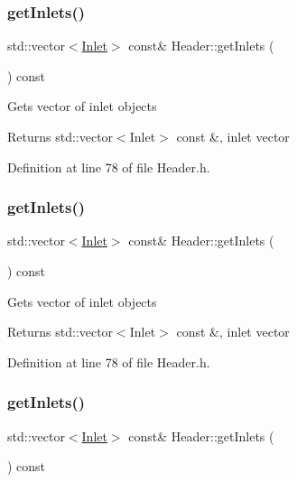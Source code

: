 \subsubsection{\texorpdfstring{get\+Inlets()}{getInlets()}\hspace{0.1cm}{\footnotesize\ttfamily [1/3]}}
{\footnotesize\ttfamily std\+::vector$<$\hyperlink{class_inlet}{Inlet}$>$ const\& Header\+::get\+Inlets (\begin{DoxyParamCaption}{ }\end{DoxyParamCaption}) const\hspace{0.3cm}{\ttfamily [inline]}}

Gets vector of inlet objects \begin{DoxyReturn}{Returns}
std\+::vector$<$\+Inlet$>$ const \&, inlet vector 
\end{DoxyReturn}


Definition at line 78 of file Header.\+h.

\mbox{\label{class_header_a625d7317488c88c949acd05c72a7c54a}} 
\subsubsection{\texorpdfstring{get\+Inlets()}{getInlets()}\hspace{0.1cm}{\footnotesize\ttfamily [2/3]}}
{\footnotesize\ttfamily std\+::vector$<$\hyperlink{class_inlet}{Inlet}$>$ const\& Header\+::get\+Inlets (\begin{DoxyParamCaption}{ }\end{DoxyParamCaption}) const\hspace{0.3cm}{\ttfamily [inline]}}

Gets vector of inlet objects \begin{DoxyReturn}{Returns}
std\+::vector$<$\+Inlet$>$ const \&, inlet vector 
\end{DoxyReturn}


Definition at line 78 of file Header.\+h.

\mbox{\label{class_header_a625d7317488c88c949acd05c72a7c54a}} 
\subsubsection{\texorpdfstring{get\+Inlets()}{getInlets()}\hspace{0.1cm}{\footnotesize\ttfamily [3/3]}}
{\footnotesize\ttfamily std\+::vector$<$\hyperlink{class_inlet}{Inlet}$>$ const\& Header\+::get\+Inlets (\begin{DoxyParamCaption}{ }\end{DoxyParamCaption}) const\hspace{0.3cm}{\ttfamily [inline]}}

